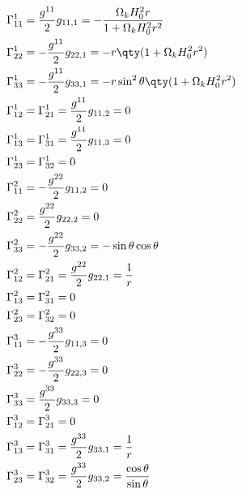 \begin{align*}
    \Gamma^1_{11} &= \frac{g^{11}}{2}g_{11,1} = -\frac{\Omega_kH_0^2r}{1 +\Omega_kH_0^2r^2}\\
    \Gamma^1_{22} &= -\frac{g^{11}}{2}g_{22,1} = -r\qty(1 + \Omega_kH_0^2r^2)\\
    \Gamma^1_{33} &= -\frac{g^{11}}{2}g_{33,1} = -r\sin^2\theta\qty(1 + \Omega_kH_0^2r^2)\\\
    \Gamma^1_{12} &= \Gamma^1_{21} = \frac{g^{11}}{2}g_{11,2} = 0\\
    \Gamma^1_{13} &= \Gamma^1_{31} = \frac{g^{11}}{2}g_{11,3} = 0\\
    \Gamma^1_{23} &= \Gamma^1_{32} = 0 \\
    \Gamma^2_{11} &= -\frac{g^{22}}{2}g_{11,2} = 0\\
    \Gamma^2_{22} &= \frac{g^{22}}{2}g_{22,2} = 0\\
    \Gamma^2_{33} &= -\frac{g^{22}}{2}g_{33,2} = -\sin\theta\cos\theta\\
    \Gamma^2_{12} &= \Gamma^2_{21} = \frac{g^{22}}{2}g_{22,1} = \frac{1}{r} \\
    \Gamma^2_{13} &= \Gamma^2_{31} = 0 \\
    \Gamma^2_{23} &= \Gamma^2_{32} = 0 \\
    \Gamma^3_{11} &= -\frac{g^{33}}{2}g_{11,3} = 0 \\
    \Gamma^3_{22} &= -\frac{g^{33}}{2}g_{22,3} = 0 \\
    \Gamma^3_{33} &= \frac{g^{33}}{2}g_{33,3} = 0 \\
    \Gamma^3_{12} &= \Gamma^3_{21} = 0 \\
    \Gamma^3_{13} &= \Gamma^3_{31} = \frac{g^{33}}{2}g_{33,1} = \frac{1}{r}\\
    \Gamma^3_{23} &= \Gamma^3_{32} = \frac{g^{33}}{2}g_{33,2} = \frac{\cos\theta}{\sin\theta}\\
\end{align*}


